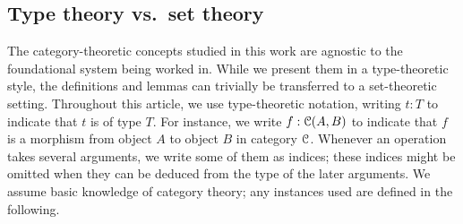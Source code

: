 \documentclass[a4paper,USenglish]{lipics}
\begin{document}
 
 
 \subsection{Type theory vs.\ set theory} The category-theoretic concepts studied in this work are agnostic to the foundational system being worked in.
 While we present them in a type-theoretic style, the definitions and lemmas can trivially be transferred to a set-theoretic setting.
 Throughout this article, we use type-theoretic notation,  writing $t:T$ to indicate that $t$ is of type $T$. 
 For instance, we write $f : {\mathcal{C}}(A,B)$ to indicate that $f$ is a morphism from object $A$ to object $B$ in category ${\mathcal{C}}$.
 Whenever an operation takes several arguments, we write some of them as indices; these indices might be omitted when 
 they can be deduced from the type of the later arguments.
 We assume basic knowledge of category theory; any instances used are defined in the following.
  
 
 
\end{document}
